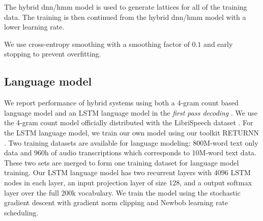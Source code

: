 \documentclass[a4paper]{article}
\begin{document}
The hybrid \ac{dnn}/\ac{hmm} model is used to generate lattices for all of the training data.
The training is then continued from the hybrid \ac{dnn}/\ac{hmm} model with a lower learning rate.

We use cross-entropy smoothing with a smoothing factor of $0.1$ and early stopping to prevent overfitting.

\subsection{Language model}
\label{sec:lm}
We report performance of hybrid systems using both a 4-gram count based language
model \cite{kneser1995improved} and an LSTM language model \cite{sundermeyer12:lstm} in the \textit{first pass decoding} \cite{beck2019:lstmlm1pass}.
We use the 4-gram count model officially distributed with the LibriSpeech dataset \cite{panayotov2015:librispeech}.
For the LSTM language model, we train our own model using our toolkit RETURNN \cite{zeyer2018:returnn}.
Two training datasets are available for language modeling: 800M-word text only data and
960h of audio transcriptions which corresponds to 10M-word text data. These two sets are merged to form one
training dataset for language model training.
Our LSTM language model has two recurrent layers with 4096 LSTM nodes in each layer, an input projection
layer of size 128, and a output softmax layer over the full 200k vocabulary.
We train the model using the stochastic gradient descent with gradient norm clipping and Newbob
learning rate scheduling.
\end{document}
